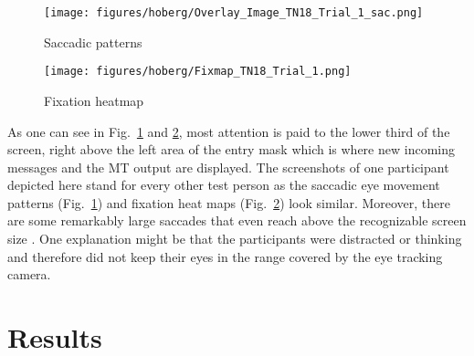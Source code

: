 \documentclass[output=paper,colorlinks,citecolor=brown]{langscibook}
\begin{document}
\begin{figure}
    
        \centering
        \texttt{[image: figures/hoberg/Overlay\_Image\_TN18\_Trial\_1\_sac.png]}
        \caption{Saccadic patterns}
        \label{fig:sacpatterns}
        
\end{figure}
    

  
  
\begin{figure}  
        \centering
        \texttt{[image: figures/hoberg/Fixmap\_TN18\_Trial\_1.png]}
        \caption{Fixation heatmap}
        \label{fig:fixheatmap}
        
\end{figure}        

As one can see in Fig.~\ref{fig:sacpatterns} and \ref{fig:fixheatmap}, most attention is paid to the lower third of the screen, right above the left area of the entry mask which is where new incoming messages and the MT output are displayed. The screenshots of one participant depicted here stand for every other test person as the saccadic eye movement patterns (Fig.~\ref{fig:sacpatterns}) and fixation heat maps (Fig.~\ref{fig:fixheatmap}) look similar. Moreover, there are some remarkably large saccades that even reach above the recognizable screen size \citep[cf.][6]{leube_sampling_2017}. One explanation might be that the participants were distracted or thinking and therefore did not keep their eyes in the range covered by the eye tracking camera.


\section{Results}
\label{hoberg:results}
\end{document}
